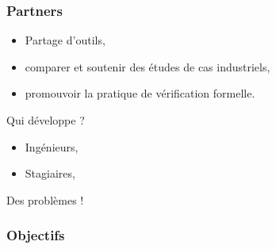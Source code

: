 \documentclass[t, english]{beamer}
\begin{document}
\begin{frame}[c]
  \frametitle{Partners}
  \begin{minipage}{.25\textwidth}
  \centering
  \end{minipage}
  
  \begin{minipage}{.7\textwidth}
     \begin{itemize}
     \item Partage d'outils,
     \item comparer et soutenir des études de cas industriels,
     \item promouvoir la pratique de vérification formelle.
     \end{itemize}
  \end{minipage}
 \end{frame}
  
\begin{frame}[plain,c]
\centering
{\Huge\LobsterTwo Qui développe ?}
\begin{center}
\begin{itemize}
     \item Ingénieurs,
     \item Stagiaires,
\end{itemize}
\end{center}
\end{frame}

\begin{frame}[plain,c]
\centering
{\Huge\LobsterTwo Des problèmes !}
\end{frame}


 \begin{frame}[c]
  \frametitle{Objectifs }
   




 \end{frame}
\end{document}
